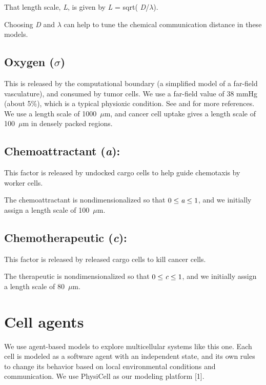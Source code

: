 \documentclass{article}
\begin{document}
That length scale, \emph{L}, is given by \emph{L} = sqrt( \emph{D}/$\lambda$).

Choosing \emph{D} and $\lambda$ can help to tune the chemical
communication distance in these models.

\subsection{Oxygen ($\sigma$)}

This is released by the computational boundary (a simplified model of a
far-field vasculature), and consumed by tumor cells.
We use a far-field value of 38 mmHg (about 5\%), which is a typical
physioxic condition. See \cite{Ghaffarizadeh2016-ga} and \cite{physicell-2018} for more references. We use a
length scale of 1000~$\mu$m, and cancer cell uptake gives a length scale of
100~$\mu$m  in densely packed regions.

\subsection{Chemoattractant (\emph{a}):}

This factor is released by undocked cargo cells to help guide chemotaxis
by worker cells.

The chemoattractant is nondimensionalized so that $0 \leq \emph{a} \leq 1$, and
we initially assign a length scale of 100~$\mu$m.

\subsection{Chemotherapeutic (\emph{c}):}
This factor is released by released cargo cells to kill cancer cells.

The therapeutic is nondimensionalized so that $0 \leq \emph{c} \leq 1$, and we
initially assign a length scale of 80~$\mu$m.

\section{Cell agents}
We use agent-based models to explore multicellular systems like this
one. Each cell is modeled as a software agent with an independent state,
and its own rules to change its behavior based on local environmental
conditions and communication. We use PhysiCell as our modeling platform
{[}1{]}.~
\end{document}
